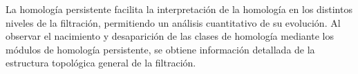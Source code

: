 %	

La homología persistente facilita la interpretación de la homología en los distintos niveles de la filtración, permitiendo un análisis cuantitativo de su evolución. Al observar el nacimiento y desaparición de las clases de homología mediante los módulos de homología persistente, se obtiene información detallada de la estructura topológica general de la filtración.

